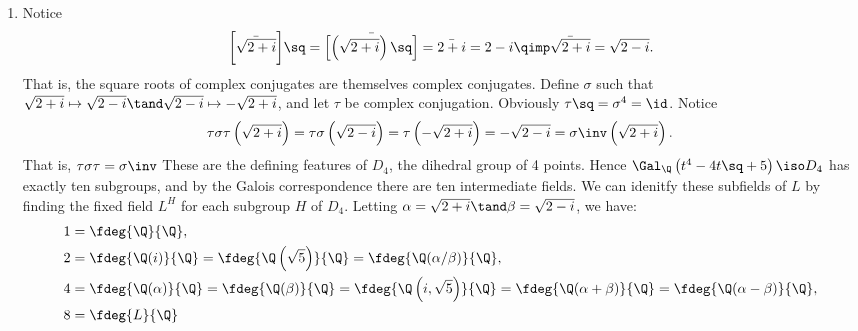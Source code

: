 \documentclass{article}
\begin{document}
\begin{enumerate}[label=(\alph*)]
  \item \begin{solution}
    Notice \begin{align*}
      \bigg[ \bar{\sqrt{2+i}} \bigg]\sq = \bar{\left[ \left( \sqrt{2+i} \right)\sq \right]} = \bar{2+i} = 2-i \qimp \bar{\sqrt{2+i}} = \sqrt{2-i}.
    \end{align*}
    That is, the square roots of complex conjugates are themselves complex conjugates.
    Define \( \sigma \) such that \( \sqrt{2+i}\mapsto \sqrt{2-i} \tand \sqrt{2-i}\mapsto-\sqrt{2+i} \), and let \( \tau \) be complex conjugation.
    Obviously \( \tau\sq = \sigma^4 = \id \).
    Notice \begin{align*}
      \tau\sigma\tau\left(\sqrt{2+i}\right) = \tau\sigma\left(\sqrt{2-i}\right) = \tau\left(-\sqrt{2+i}\right) = -\sqrt{2-i} = \sigma\inv\left(\sqrt{2+i}\right).
    \end{align*}
    That is, \( \tau\sigma\tau = \sigma\inv \)
    These are the defining features of \( D_4 \), the dihedral group of 4 points.
    Hence \( \Gal_\Q\left(t^4-4t\sq+5\right) \iso D_4 \) has exactly ten subgroups, and by the Galois correspondence there are ten intermediate fields.
    We can idenitfy these subfields of \( L \) by finding the fixed field \( L^H \) for each subgroup \( H \) of \( D_4 \).
    Letting \( \alpha=\sqrt{2+i}\tand \beta=\sqrt{2-i} \), we have:
    \begin{align*}
    1 &= \fdeg{\Q}{\Q},\\
    2 &= \fdeg{\Q(i)}{\Q} = \fdeg{\Q\left(\sqrt{5}\right)}{\Q} = \fdeg{\Q(\alpha/\beta)}{\Q},\\
    4 &= \fdeg{\Q(\alpha)}{\Q} = \fdeg{\Q(\beta)}{\Q} = \fdeg{\Q\left( i,\sqrt{5} \right)}{\Q} = \fdeg{\Q(\alpha+\beta)}{\Q} = \fdeg{\Q(\alpha-\beta)}{\Q}, \\
    8 &= \fdeg{L}{\Q}
    \end{align*}
  \end{solution}
\end{enumerate}
\end{document}
